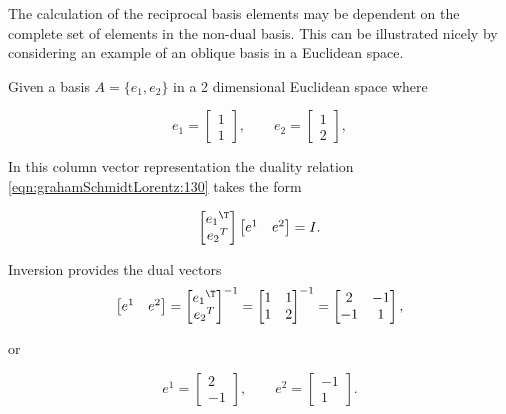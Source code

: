 The calculation of the reciprocal basis elements may be dependent on the complete set of elements in the non-dual basis.  This can be illustrated nicely by considering an example of an oblique basis in a Euclidean space.

Given a basis $A = \{e_1, e_2\}$ in a 2 dimensional Euclidean space where

\begin{equation}\label{eqn:grahamSchmidtLorentz:90}
e_1 =
\begin{bmatrix}
1 \\
1
\end{bmatrix},\qquad
e_2 =
\begin{bmatrix}
1 \\
2
\end{bmatrix},
\end{equation}

In this column vector representation the duality relation \ref{eqn:grahamSchmidtLorentz:130} takes the form

\begin{equation}\label{eqn:grahamSchmidtLorentz:150}
\begin{bmatrix}
{e_1}^\T \\
{e_2}^T
\end{bmatrix}
\begin{bmatrix}
e^1 & e^2
\end{bmatrix} = I.
\end{equation}

Inversion provides the dual vectors
\begin{equation}\label{eqn:grahamSchmidtLorentz:170}
\begin{bmatrix}
e^1 & e^2
\end{bmatrix}
=
{
\begin{bmatrix}
{e_1}^\T \\
{e_2}^T
\end{bmatrix}
}^{-1}
=
{\begin{bmatrix}
1 & 1 \\
1 & 2
\end{bmatrix}}^{-1}
=
\begin{bmatrix}
2 & -1 \\
-1 & 1
\end{bmatrix},
\end{equation}

or

\begin{equation}\label{eqn:grahamSchmidtLorentz:190}
e^1 =
\begin{bmatrix}
2 \\
-1
\end{bmatrix}, \qquad
e^2 =
\begin{bmatrix}
-1 \\
1
\end{bmatrix}.
\end{equation}

